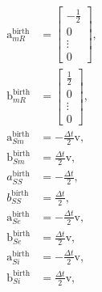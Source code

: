 \documentclass{jpmarticle}
\renewcommand{\vec}[1]{\boldsymbol{\mathrm{#1}}}
\begin{document}
\begin{equation}
  \begin{split}
    \vec{a}_{mR}^{\text{birth}} &=
    \begin{bmatrix}
      - \frac{1}{2} \\ 0 \\ \vdots \\ 0
    \end{bmatrix},
    \\
    \vec{b}_{mR}^{\text{birth}} &=
    \begin{bmatrix}
      \frac{1}{2} \\ 0 \\ \vdots \\ 0
    \end{bmatrix},
    \\
    \vec{a}_{Sm}^{\text{birth}} &=
    - \frac{\Delta t}{2} \vec{v},
    \\
    \vec{b}_{Sm}^{\text{birth}} &=
    \frac{\Delta t}{2} \vec{v},
    \\
    a_{SS}^{\text{birth}} &=
    - \frac{\Delta t}{2},
    \\
    b_{SS}^{\text{birth}} &=
    \frac{\Delta t}{2},
    \\
    \vec{a}_{Se}^{\text{birth}} &= - \frac{\Delta t}{2} \vec{v},
    \\
    \vec{b}_{Se}^{\text{birth}} &= \frac{\Delta t}{2} \vec{v},
    \\
    \vec{a}_{Si}^{\text{birth}} &= - \frac{\Delta t}{2} \vec{v},
    \\
    \vec{b}_{Si}^{\text{birth}} &= \frac{\Delta t}{2} \vec{v},
  \end{split}
\end{equation}
\end{document}
